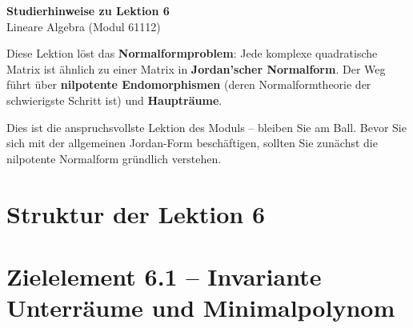 \documentclass[a4paper,12pt]{article}
\begin{document}
\begin{center}
  {\LARGE\bfseries Studierhinweise zu Lektion 6}\\[0.5em]
  {\large Lineare Algebra (Modul 61112)}
\end{center}

\vspace{0.8em}

Diese Lektion löst das \textbf{Normalformproblem}: Jede komplexe quadratische Matrix ist ähnlich zu
einer Matrix in \textbf{Jordan'scher Normalform}. Der Weg führt über \textbf{nilpotente Endomorphismen}
(deren Normalformtheorie der schwierigste Schritt ist) und \textbf{Haupträume}.

Dies ist die anspruchsvollste Lektion des Moduls -- bleiben Sie am Ball. Bevor Sie sich mit
der allgemeinen Jordan-Form beschäftigen, sollten Sie zunächst die nilpotente Normalform
gründlich verstehen.

\section*{Struktur der Lektion 6}

\begin{center}
\end{center}

\newpage

\section*{Zielelement 6.1 -- Invariante Unterräume und Minimalpolynom}
\end{document}
